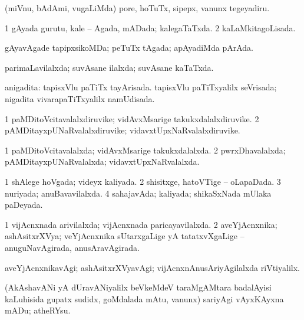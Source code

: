 \bentry
{} 
\gl{\sakirx}
\expl{}
\bmng
(miVnu, bAdAmi, \mo vugaLiMda) pore, hoTuTx, sipepx, \mo vanunx tegeyadiru. 
\emng
\eentry

\bentry
{} 
\gl{\gu}
\expl{}
\bmng
\bnum
\num{1} gAyada gurutu, kale -- Agada, mADada; kalegaTaTxda. 
\num{2} kaLaMkitagoLisada. 
\enum
\emng
\eentry

\bentry
{} 
\gl{\gu}
\expl{}
\bmng
gAyavAgade tapipxsikoMDa; peTuTx tAgada; apAyadiMda pArAda. 
\emng
\eentry

\bentry
{} 
\gl{\gu}
\expl{}
\bmng
parimaLavilalxda; suvAsane ilalxda; suvAsane kaTaTxda. 
\emng
\eentry

\bentry
{} 
\gl{\gu}
\expl{}
\bmng
anigadita: 
\banum
{} tapisxVlu paTiTx tayArisada. 
 tapisxVlu paTiTxyalilx seVrisada; nigadita vivarapaTiTxyalilx namUdisada. 
\eanum
\emng
\eentry

\bentry
{} 
\gl{\nA}
\expl{}
\bmng
\bnum
\num{1} paMDitoVcitavalalxdiruvike; vidAvxMsarige takukxdalalxdiruvike. 
\num{2} pAMDitayxpUNaRvalalxdiruvike; vidavxtUpxNaRvalalxdiruvike. 
\enum
\emng
\eentry

\bentry
{} 
\gl{\gu} 
\bmng
\bnum
\num{1} paMDitoVcitavalalxda; vidAvxMsarige takukxdalalxda. 
\num{2} pwrxDhavalalxda; pAMDitayxpUNaRvalalxda; vidavxtUpxNaRvalalxda. 
\enum
\emng
\eentry

\bentry
{} 
\gl{\gu}
\expl{}
\bmng
\bnum
\num{1} shAlege hoVgada; videyx kaliyada. 
\num{2} shisitxge, hatoVTige -- oLapaDada. 
\num{3} nuriyada; anuBavavilalxda. 
\num{4} sahajavAda; kaliyada; shikaSxNada mUlaka paDeyada. 
\enum
\emng
\eentry

\bentry
{} 
\gl{\gu}
\expl{}
\bmng
\bnum
\num{1} vijAcnxnada arivilalxda; vijAcnxnada paricayavilalxda. 
\num{2} aveYjAcnxnika; ashAsitxrXVya; veYjAcnxnika sUtarxgaLige yA tatatxvXgaLige -- anuguNavAgirada, anusAravAgirada. 
\enum
\emng
\eentry

\bentry
{} 
\gl{\kirxvi}
\expl{}
\bmng
aveYjAcnxnikavAgi; ashAsitxrXVyavAgi; vijAcnxnAnusAriyAgilalxda riVtiyalilx. 
\emng
\eentry

\bentry
{} 
\gl{\sakirx}
\expl{}
\bmng
(AkAshavANi yA dUravANiyalilx beVkeMdeV taraMgAMtara badalAyisi kaLuhisida gupatx sudidx, goMdalada mAtu, \mo vanunx) sariyAgi vAyxKAyxna mADu; atheRYsu. 
\emng
\eentry


